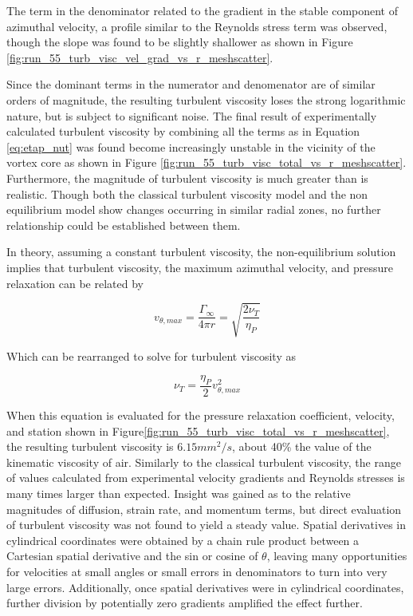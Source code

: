 


The term in the denominator related to the gradient in the stable component of 
azimuthal velocity, a profile similar to the Reynolds stress term was observed, 
though the slope was found to be slightly shallower as shown in Figure 
\ref{fig:run_55_turb_visc_vel_grad_vs_r_meshscatter}.



Since the dominant terms in the numerator and denomenator are of similar orders 
of magnitude, the resulting turbulent viscosity loses the strong logarithmic 
nature, but is subject to significant noise. The final result of experimentally 
calculated turbulent viscosity by combining all the terms as in Equation 
\ref{eq:etap_nut} was found become increasingly unstable in the vicinity of the 
vortex core as shown in Figure 
\ref{fig:run_55_turb_visc_total_vs_r_meshscatter}. Furthermore, the magnitude 
of turbulent viscosity is much greater than is realistic. Though both the 
classical turbulent viscosity model and the non equilibrium model show changes 
occurring in similar radial zones, no further relationship could be established 
between them.



In theory, assuming a constant turbulent viscosity, the non-equilibrium 
solution  implies that turbulent viscosity, the maximum azimuthal velocity, and 
pressure relaxation can be related by

\begin{equation}
v_{\theta, max} = \frac{\Gamma_\infty}{4 \pi r} = \sqrt{\frac{2 \nu_T}{\eta_P}}
\end{equation}

Which can be rearranged to solve for turbulent viscosity as

\begin{equation}
\nu_T = \frac{\eta_P}{2} v_{\theta, max}^2 
\end{equation}

\noindent
When this equation is evaluated for the pressure relaxation coefficient, 
velocity, and station shown in 
Figure\ref{fig:run_55_turb_visc_total_vs_r_meshscatter}, the resulting 
turbulent viscosity is $6.15 mm^2/s$, about 40\% the value of the kinematic 
viscosity of air. Similarly to the classical turbulent viscosity, the range of 
values calculated from experimental velocity gradients and Reynolds stresses is 
many times larger than expected. Insight 
was gained as to the relative magnitudes of diffusion, strain rate, and 
momentum terms, but direct evaluation of turbulent 
viscosity was not found to yield a steady value. Spatial derivatives in 
cylindrical coordinates were obtained by a chain rule product between a 
Cartesian spatial derivative and the sin or cosine of $\theta$, leaving many 
opportunities for velocities at small angles or small errors in denominators to 
turn into very large errors. Additionally, once spatial derivatives were in 
cylindrical coordinates, further division by potentially zero gradients 
amplified the effect further. 